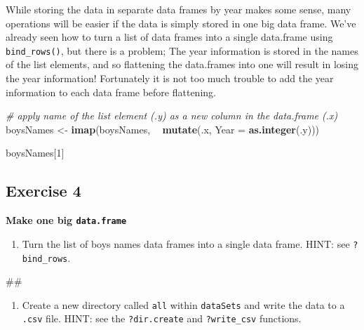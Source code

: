 \documentclass[]{book}
\newenvironment{Shaded}{\begin{snugshade}}{\end{snugshade}}
\newcommand{\KeywordTok}[1]{\textcolor[rgb]{0.13,0.29,0.53}{\textbf{#1}}}
\newcommand{\DataTypeTok}[1]{\textcolor[rgb]{0.13,0.29,0.53}{#1}}
\newcommand{\DecValTok}[1]{\textcolor[rgb]{0.00,0.00,0.81}{#1}}
\newcommand{\StringTok}[1]{\textcolor[rgb]{0.31,0.60,0.02}{#1}}
\newcommand{\CommentTok}[1]{\textcolor[rgb]{0.56,0.35,0.01}{\textit{#1}}}
\newcommand{\OperatorTok}[1]{\textcolor[rgb]{0.81,0.36,0.00}{\textbf{#1}}}
\newcommand{\NormalTok}[1]{#1}
\providecommand{\tightlist}{%
  \setlength{\itemsep}{0pt}\setlength{\parskip}{0pt}}
\begin{document}
While storing the data in separate data frames by year makes some sense,
many operations will be easier if the data is simply stored in one big
data frame. We've already seen how to turn a list of data frames into a
single data.frame using \texttt{bind\_rows()}, but there is a problem;
The year information is stored in the names of the list elements, and so
flattening the data.frames into one will result in losing the year
information! Fortunately it is not too much trouble to add the year
information to each data frame before flattening.

\begin{Shaded}
\begin{Highlighting}[]
\CommentTok{# apply name of the list element (.y) as a new column in the data.frame (.x)}
\NormalTok{boysNames <-}\StringTok{ }\KeywordTok{imap}\NormalTok{(boysNames, }\OperatorTok{~}\StringTok{ }\KeywordTok{mutate}\NormalTok{(.x, }\DataTypeTok{Year =} \KeywordTok{as.integer}\NormalTok{(.y)))}

\NormalTok{boysNames[}\DecValTok{1}\NormalTok{]}
\end{Highlighting}
\end{Shaded}

\subsection{Exercise 4}\label{exercise-4-1}

\textbf{Make one big \texttt{data.frame}}

\begin{enumerate}
\def\labelenumi{\arabic{enumi}.}
\tightlist
\item
  Turn the list of boys names data frames into a single data frame.
  HINT: see \texttt{?bind\_rows}.
\end{enumerate}

\begin{Shaded}
\begin{Highlighting}[]
\NormalTok{## }
\end{Highlighting}
\end{Shaded}

\begin{enumerate}
\def\labelenumi{\arabic{enumi}.}
\setcounter{enumi}{1}
\tightlist
\item
  Create a new directory called \texttt{all} within \texttt{dataSets}
  and write the data to a \texttt{.csv} file. HINT: see the
  \texttt{?dir.create} and \texttt{?write\_csv} functions.
\end{enumerate}
\end{document}
